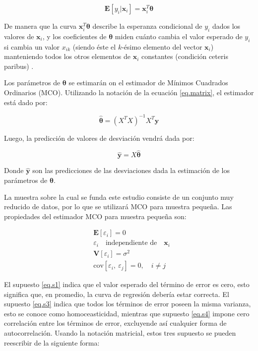 \begin{equation}
    \label{eq.e-xb}
    \bm{E}[y_i|\bm{x}_i] = \bm{x}_i^T\bm{\theta}
\end{equation}

De manera que la curva $\bm{x}_i^T\bm{\theta}$ describe la esperanza condicional de $y_i$ dados los valores de $\bm{x}_i$, y los coeficientes de $\bm{\theta}$ miden cuánto cambia el valor esperado de $y_i$ si cambia un valor $x_{ik}$ (siendo éste el $k$-ésimo elemento del vector $\bm{x}_i$) manteniendo todos los otros elementos de $\bm{x}_i$ constantes (condición ceteris paribus) \cite{verbeek}.

Los parámetros de $\bm{\theta}$ se estimarán on el estimador de Mínimos Cuadrados Ordinarios (MCO). Utilizando la notación de la ecuación \eqref{eq.matrix}, el estimador está dado por:

\begin{equation}
    \label{eq.mco}
    \bm{\hat\theta} = \left( X^TX\right)^{-1}X^T\bm{y}
\end{equation}

Luego, la predicción de valores de desviación vendrá dada por:

\begin{equation}
    \label{eq.predicc}
    \hat{\bm{y}} = X\hat{\bm{\theta}}
\end{equation}

Donde $\hat{\bm{y}}$ son las predicciones de las desviaciones dada la estimación de los parámetros de $\bm{\theta}$.  

La muestra sobre la cual se funda este estudio consiste de un conjunto muy reducido de datos, por lo que se utilizará MCO para muestra pequeña. Las propiedades del estimador MCO para muestra pequeña son:

\begin{align}
    & \label{eq.s1} \bm{E}[\varepsilon_i] = 0\\
    & \label{eq.s2} \varepsilon_i\quad\text{independiente de}\quad \bm{x}_i\\
    & \label{eq.s3} \bm{V}[\varepsilon_i]=\sigma^2 \\
    & \label{eq.s4} \text{cov}[\varepsilon_i,~\varepsilon_j] = 0,\quad i\neq j
\end{align}

El supuesto \eqref{eq.s1} indica que el valor esperado del término de error es cero, esto significa que, en promedio, la curva de regresión debería estar correcta. El supuesto \eqref{eq.s3} indica que todos los términos de error poseen la misma varianza, esto se conoce como homoceasticidad, mientras que supuesto \eqref{eq.s4} impone cero correlación entre los términos de error, excluyende así cualquier forma de autocorrelación. Usando la notación matricial, estos tres supuesto se pueden reescribir de la siguiente forma:

